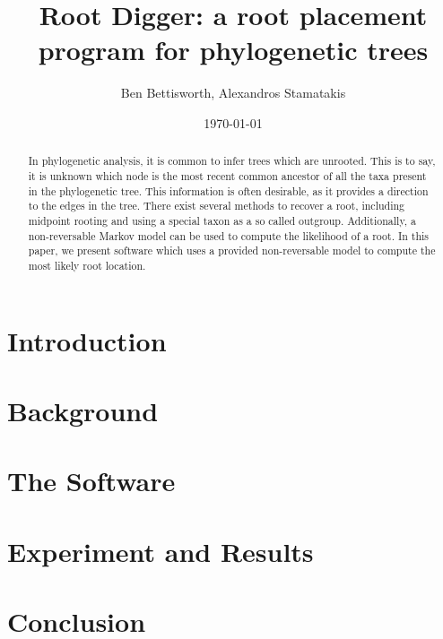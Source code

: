 \documentclass{article}
\title{Root Digger: a root placement program for phylogenetic trees}
\author{Ben Bettisworth, Alexandros Stamatakis}
\date{\today}
\begin{document}
\begin{abstract}
In phylogenetic analysis, it is common to infer trees which are unrooted. This
is to say, it is unknown which node is the most recent common ancestor of all
the taxa present in the phylogenetic tree. This information is often desirable,
as it provides a direction to the edges in the tree.  There exist several
methods to recover a root, including midpoint rooting and using a special taxon
as a so called outgroup. Additionally, a non-reversable Markov model can be used
to compute the likelihood of a root. In this paper, we present software which
uses a provided non-reversable model to compute the most likely root location.
\end{abstract}

\maketitle



\section{Introduction}


\section{Background}


\section{The Software}


\section{Experiment and Results}



\section{Conclusion}

\end{document}
